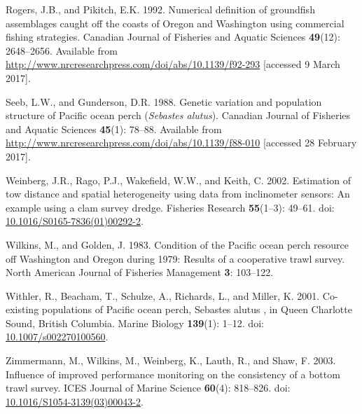 \documentclass[12pt,]{article}
\begin{document}
\hypertarget{ref-rogers_numerical_1992}{}
Rogers, J.B., and Pikitch, E.K. 1992. Numerical definition of groundfish
assemblages caught off the coasts of Oregon and Washington using
commercial fishing strategies. Canadian Journal of Fisheries and Aquatic
Sciences \textbf{49}(12): 2648--2656. Available from
\url{http://www.nrcresearchpress.com/doi/abs/10.1139/f92-293}
{[}accessed 9 March 2017{]}.

\hypertarget{ref-seeb_genetic_1988}{}
Seeb, L.W., and Gunderson, D.R. 1988. Genetic variation and population
structure of Pacific ocean perch (\emph{Sebastes alutus}). Canadian
Journal of Fisheries and Aquatic Sciences \textbf{45}(1): 78--88.
Available from
\url{http://www.nrcresearchpress.com/doi/abs/10.1139/f88-010}
{[}accessed 28 February 2017{]}.

\hypertarget{ref-weinberg_estimation_2002}{}
Weinberg, J.R., Rago, P.J., Wakefield, W.W., and Keith, C. 2002.
Estimation of tow distance and spatial heterogeneity using data from
inclinometer sensors: An example using a clam survey dredge. Fisheries
Research \textbf{55}(1--3): 49--61. doi:
\href{https://doi.org/10.1016/S0165-7836(01)00292-2}{10.1016/S0165-7836(01)00292-2}.

\hypertarget{ref-wilkins_condition_1983}{}
Wilkins, M., and Golden, J. 1983. Condition of the Pacific ocean perch
resource off Washington and Oregon during 1979: Results of a cooperative
trawl survey. North American Journal of Fisheries Management \textbf{3}:
103--122.

\hypertarget{ref-withler_co-existing_2001}{}
Withler, R., Beacham, T., Schulze, A., Richards, L., and Miller, K.
2001. Co-existing populations of Pacific ocean perch, Sebastes alutus ,
in Queen Charlotte Sound, British Columbia. Marine Biology
\textbf{139}(1): 1--12. doi:
\href{https://doi.org/10.1007/s002270100560}{10.1007/s002270100560}.

\hypertarget{ref-zimmermann_influence_2003}{}
Zimmermann, M., Wilkins, M., Weinberg, K., Lauth, R., and Shaw, F. 2003.
Influence of improved performance monitoring on the consistency of a
bottom trawl survey. ICES Journal of Marine Science \textbf{60}(4):
818--826. doi:
\href{https://doi.org/10.1016/S1054-3139(03)00043-2}{10.1016/S1054-3139(03)00043-2}.
\end{document}
